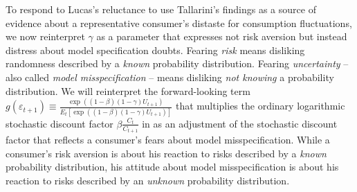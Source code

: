 To respond to  Lucas's reluctance to use  Tallarini's findings as a source of evidence about  a
representative consumer's distaste for  consumption fluctuations,  we now reinterpret $\gamma$ as a parameter that expresses not risk aversion but instead distress about
model specification doubts. Fearing {\it risk\/} means disliking randomness described by a {\it known\/} probability distribution.  Fearing {\it uncertainty\/}
-- also called  {\it model misspecification\/} --  means disliking {\it not knowing\/} a
probability distribution.
%
%
We will reinterpret the forward-looking term  $ g(\varepsilon_{t+1}) \equiv {\frac{\exp \left( \left(
1-\beta \right) \left( 1-\gamma \right) U_{t+1}\right) }{E_{t}\left[
\exp \left( \left( 1-\beta \right) \left( 1-\gamma \right)
U_{t+1}\right) \right] }}$ that multiplies the ordinary logarithmic
stochastic discount factor $\beta {\frac{C_{t}}{C_{t+1}}}$ in  as an
adjustment of the stochastic discount factor  that reflects a consumer's fears about model
misspecification.  While a consumer's risk aversion is about  his reaction to risks described by a {\it known\/} probability distribution,
his attitude about model misspecification is about his reaction to risks described by an {\it unknown\/} probability distribution.
%
%

